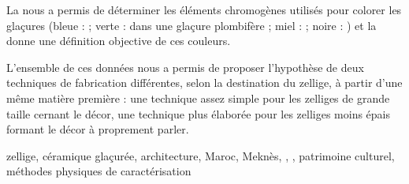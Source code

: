 {La \SAO nous a permis de déterminer les éléments chromogènes utilisés pour colorer les glaçures (bleue :  ; verte :  dans une glaçure plombifère ; miel :  ; noire : ) et la \CHRO donne une définition objective de ces couleurs.

L'ensemble de ces données nous a permis de proposer l'hypothèse de deux techniques de fabrication différentes, selon la destination du zellige, à partir d'une même matière première : une technique assez simple pour les zelliges de grande taille cernant le décor, une technique plus élaborée pour les zelliges moins épais formant le décor à proprement parler.

\vfill

\begin{motsclef}
   zellige, céramique glaçurée, architecture, Maroc, Meknès, 
   \PaM, , patrimoine culturel, méthodes physiques 
   de caractérisation
\end{motsclef}
}
